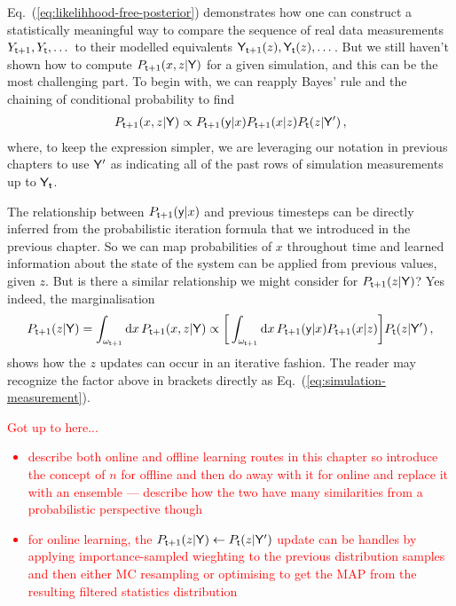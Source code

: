 Eq.~(\ref{eq:likelihhood-free-posterior}) demonstrates how one can construct a statistically meaningful way to compare the sequence of real data measurements $Y_{{\sf t}+1}, Y_{{\sf t}}, \dots$ to their modelled equivalents ${\sf Y}_{{\sf t}+1}(z), {\sf Y}_{{\sf t}}(z), \dots$. But we still haven't shown how to compute $P_{{\sf t}+1}(x,z\vert {\sf Y})$ for a given simulation, and this can be the most challenging part. To begin with, we can reapply Bayes' rule and the chaining of conditional probability to find 
\begin{align}
P_{{\sf t}+1}(x,z\vert {\sf Y}) \propto P_{{\sf t}+1}({\sf y}\vert x)P_{{\sf t}+1}(x\vert z)P_{{\sf t}}(z\vert {\sf Y}') \,,
\end{align}
where, to keep the expression simpler, we are leveraging our notation in previous chapters to use ${\sf Y}'$ as indicating all of the past rows of simulation measurements up to ${\sf Y}_{{\sf t}}$. 

The relationship between $P_{{\sf t}+1}({\sf y}\vert x)$ and previous timesteps can be directly inferred from the probabilistic iteration formula that we introduced in the previous chapter. So we can map probabilities of $x$ throughout time and learned information about the state of the system can be applied from previous values, given $z$. But is there a similar relationship we might consider for $P_{{\sf t}+1}(z\vert {\sf Y})$? Yes indeed, the marginalisation
\begin{align} 
P_{{\sf t}+1}(z\vert {\sf Y}) = \int_{\omega_{{\sf t}+1}} {\rm d}x \, P_{{\sf t}+1}(x,z\vert {\sf Y}) \propto \bigg[ \int_{\omega_{{\sf t}+1}} {\rm d}x \, P_{{\sf t}+1}({\sf y}\vert x) P_{{\sf t}+1}(x\vert z) \bigg] P_{{\sf t}}(z\vert {\sf Y}')\,,
\end{align}
shows how the $z$ updates can occur in an iterative fashion. The reader may recognize the factor above in brackets directly as Eq.~(\ref{eq:simulation-measurement}).

\textcolor{red}{Got up to here...
\begin{itemize}
\item{describe both online and offline learning routes in this chapter so introduce the concept of $n$ for offline and then do away with it for online and replace it with an ensemble --- describe how the two have many similarities from a probabilistic perspective though}
\item{for online learning, the $P_{{\sf t}+1}(z\vert {\sf Y}) \leftarrow P_{{\sf t}}(z\vert {\sf Y}')$ update can be handles by applying importance-sampled wieghting to the previous distribution samples and then either MC resampling or optimising to get the MAP from the resulting filtered statistics distribution}
\end{itemize}}


